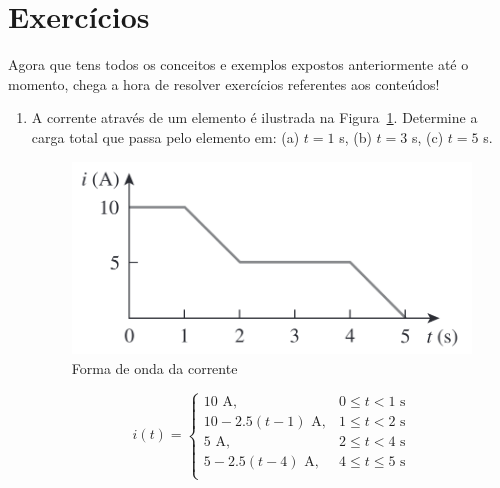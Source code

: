 \section{Exercícios}

Agora que tens todos os conceitos e exemplos expostos anteriormente até o
momento, chega a hora de resolver exercícios referentes aos conteúdos!

\begin{enumerate}
	\item A corrente através de um elemento é ilustrada na Figura~\ref{fig:fig5}. Determine a carga total que passa pelo elemento em:
	      (a) \( t = 1 \) s, (b) \( t = 3 \) s, (c) \( t = 5 \) s.

	      \begin{figure}[H]
		      \centering
		      \includegraphics[height=0.15\textwidth]{./fig/fig5.png}
		      \caption{Forma de onda da corrente}
		      \label{fig:fig5}
	      \end{figure}

	      \[
		      i(t) =
		      \begin{cases}
			      10 \text{ A},              & 0 \leq t < 1 \text{ s}    \\
			      10 - 2.5(t - 1) \text{ A}, & 1 \leq t < 2 \text{ s}    \\
			      5 \text{ A},               & 2 \leq t < 4 \text{ s}    \\
			      5 - 2.5(t - 4) \text{ A},  & 4 \leq t \leq 5 \text{ s} \\
		      \end{cases}
	      \]


\end{enumerate}

